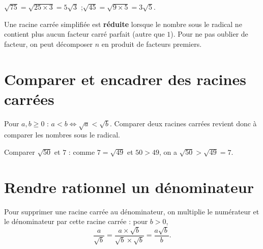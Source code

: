 \begin{exemple}
$\sqrt{75}=\sqrt{25\times3}=5\sqrt3$ ;\quad $\sqrt{45}=\sqrt{9\times5}=3\sqrt5$.
\end{exemple}

\begin{aretenir}
Une racine carrée simplifiée est \textbf{réduite} lorsque le nombre sous le radical ne
contient plus aucun facteur carré parfait (autre que $1$). Pour ne pas oublier de facteur,
on peut décomposer $n$ en produit de facteurs premiers.
\end{aretenir}

\section{Comparer et encadrer des racines carrées}

\begin{propriete}
Pour $a,b\ge0$ : $a<b \iff \sqrt a<\sqrt b$. Comparer deux racines carrées revient donc à
comparer les nombres sous le radical.
\end{propriete}

\begin{exemple}
Comparer $\sqrt{50}$ et $7$ : comme $7=\sqrt{49}$ et $50>49$, on a $\sqrt{50}>\sqrt{49}=7$.
\end{exemple}

\begin{illus}
\end{illus}

\section{Rendre rationnel un dénominateur}

\begin{propriete}
Pour supprimer une racine carrée au dénominateur, on multiplie le numérateur et le
dénominateur par cette racine carrée : pour $b>0$,
\[
\frac{a}{\sqrt b}=\frac{a\times\sqrt b}{\sqrt b\times\sqrt b}=\frac{a\sqrt b}{b}.
\]
\end{propriete}

